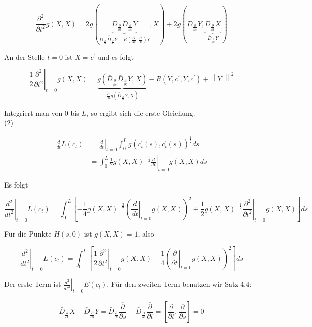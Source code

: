 \documentclass[10pt]{article}
\begin{document}
$$
\frac{\partial^{2}}{\partial t^{2}} g(X, X)=2 g(\underbrace{\bar{D}_{\frac{\partial}{\partial t}} \bar{D}_{\frac{\partial}{\partial s}} Y}_{\bar{D}_{\frac{\partial}{\partial s}} \overline{\bar{D}}_{\frac{\partial}{\partial t}} Y-R\left(\frac{\partial}{\partial t}, \frac{\partial}{\partial s}\right) Y}, X)+2 g(\bar{D}_{\frac{\partial}{\partial s}} Y, \underbrace{\bar{D}_{\frac{\partial}{\partial t}} X}_{\bar{D}_{\frac{\partial}{\partial s}} Y})
$$

An der Stelle $t=0$ ist $X=c^{\prime}$ und es folgt

$$
\left.\frac{1}{2} \frac{\partial^{2}}{\partial t^{2}}\right|_{t=0} g(X, X)=\underbrace{g\left(\bar{D}_{\frac{\partial}{\partial s}} \bar{D}_{\frac{\partial}{\partial t}} Y, X\right)}_{\frac{\partial}{\partial s} g\left(\bar{D}_{\frac{\partial}{\partial t}} Y, X\right)}-R\left(Y, c^{\prime}, Y, c^{\prime}\right)+\left\|Y^{\prime}\right\|^{2}
$$

Integriert man von 0 bis $L$, so ergibt sich die erste Gleichung.\\
(2)

$$
\begin{aligned}
\frac{d}{d t} L\left(c_{t}\right) & =\left.\frac{d}{d t}\right|_{t=0} \int_{0}^{L} g\left(c_{t}^{\prime}(s), c_{t}^{\prime}(s)\right)^{\frac{1}{2}} d s \\
& =\left.\int_{0}^{L} \frac{1}{2} g(X, X)^{-\frac{1}{2}} \frac{d}{d t}\right|_{t=0} g(X, X) d s
\end{aligned}
$$

Es folgt

$$
\left.\frac{d^{2}}{d t^{2}}\right|_{t=0} L\left(c_{t}\right)=\int_{0}^{L}\left[-\frac{1}{4} g(X, X)^{-\frac{3}{2}}\left(\left.\frac{d}{d t}\right|_{t=0} g(X, X)\right)^{2}+\left.\frac{1}{2} g(X, X)^{-\frac{1}{2}} \frac{\partial^{2}}{\partial t^{2}}\right|_{t=0} g(X, X)\right] d s
$$

Für die Punkte $H(s, 0)$ ist $g(X, X)=1$, also

$$
\left.\frac{d^{2}}{d t^{2}}\right|_{t=0} L\left(c_{t}\right)=\int_{0}^{L}\left[\left.\frac{1}{2} \frac{\partial^{2}}{\partial t^{2}}\right|_{t=0} g(X, X)-\frac{1}{4}\left(\left.\frac{\partial}{\partial t}\right|_{t=0} g(X, X)\right)^{2}\right] d s
$$

Der erste Term ist $\left.\frac{d^{2}}{d t^{2}}\right|_{t=0} E\left(c_{t}\right)$. Für den zweiten Term benutzen wir Satz 4.4:

$$
\bar{D}_{\frac{\partial}{\partial t}} X-\bar{D}_{\frac{\partial}{\partial s}} Y=\bar{D}_{\frac{\partial}{\partial t}} \overline{\frac{\partial}{\partial s}}-\bar{D}_{\frac{\partial}{\partial s}} \overline{\frac{\partial}{\partial t}}=\overline{\left[\frac{\partial}{\partial t}, \frac{\partial}{\partial s}\right]}=0
$$
\end{document}
